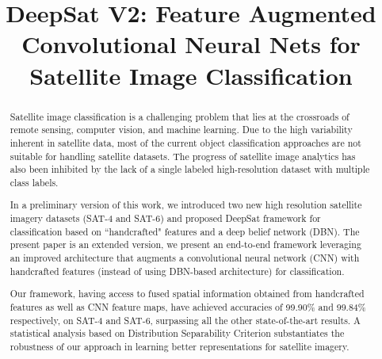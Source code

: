 \documentclass[]{interact}
\theoremstyle{plain}\newtheorem{theorem}{Theorem}[section]
\theoremstyle{definition}
\theoremstyle{remark}
\begin{document}
\title{DeepSat V2: Feature Augmented Convolutional Neural Nets for Satellite Image Classification}

\author{
}

\maketitle

\begin{abstract}
Satellite image classification is a challenging problem that lies at the crossroads of remote sensing, computer vision, and machine learning. Due to the high variability inherent in satellite data, most of the current object classification approaches are not suitable for handling satellite datasets. The progress of satellite image analytics has also been inhibited by the lack of a single labeled high-resolution dataset with multiple class labels.

In a preliminary version of this work, we introduced two new high resolution satellite imagery datasets (SAT-4 and SAT-6) and proposed DeepSat framework for classification based on ``handcrafted" features and a deep belief network (DBN). The present paper is an extended version, we present an end-to-end framework leveraging an improved architecture that augments a convolutional neural network (CNN) with handcrafted features (instead of using DBN-based architecture) for classification. 

 Our framework, having access to fused spatial information obtained from handcrafted features as well as CNN feature maps, have achieved accuracies of 99.90\% and 99.84\% respectively, on SAT-4 and SAT-6, surpassing all the other state-of-the-art results. A statistical analysis based on Distribution Separability Criterion substantiates the robustness of our approach in learning better representations for satellite imagery. 
\end{abstract}
\end{document}
